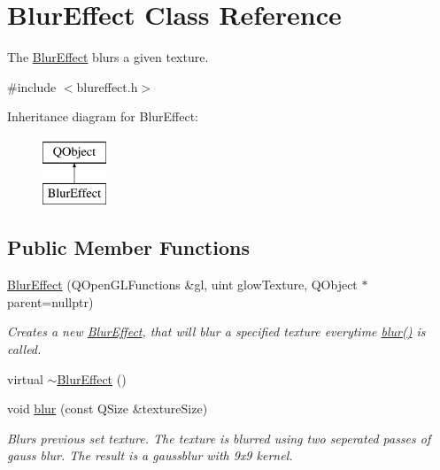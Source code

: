 \hypertarget{class_blur_effect}{}\section{Blur\+Effect Class Reference}
\label{class_blur_effect}


The \hyperlink{class_blur_effect}{Blur\+Effect} blurs a given texture.  




{\ttfamily \#include $<$blureffect.\+h$>$}

Inheritance diagram for Blur\+Effect\+:\begin{figure}[H]
\begin{center}
\leavevmode
\includegraphics[height=2.000000cm]{class_blur_effect}
\end{center}
\end{figure}
\subsection*{Public Member Functions}
\begin{DoxyCompactItemize}
\item 
\hyperlink{class_blur_effect_a3653fdf73228f64b5fab03589060c704}{Blur\+Effect} (Q\+Open\+G\+L\+Functions \&gl, uint glow\+Texture, Q\+Object $\ast$parent=nullptr)
\begin{DoxyCompactList}\small\item\em Creates a new \hyperlink{class_blur_effect}{Blur\+Effect}, that will blur a specified texture everytime \hyperlink{class_blur_effect_a0317d7ce7078d1e28e7e5b37fb60b9f3}{blur()} is called. \end{DoxyCompactList}\item 
virtual \hyperlink{class_blur_effect_aeb30b45dd769774ff0f0706a4ad6566c}{$\sim$\+Blur\+Effect} ()
\item 
void \hyperlink{class_blur_effect_a0317d7ce7078d1e28e7e5b37fb60b9f3}{blur} (const Q\+Size \&texture\+Size)
\begin{DoxyCompactList}\small\item\em Blurs previous set texture.  The texture is blurred using two seperated passes of gauss blur. The result is a gaussblur with 9x9 kernel. \end{DoxyCompactList}\end{DoxyCompactItemize}
